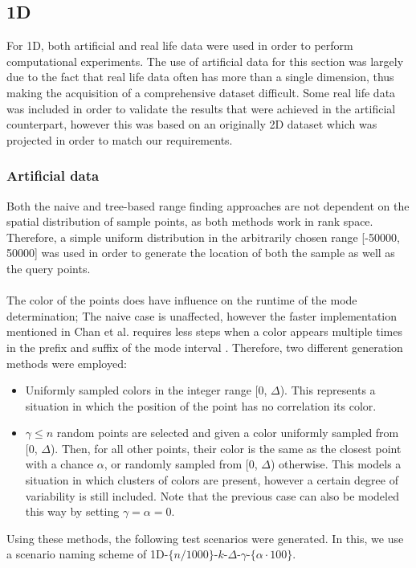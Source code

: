 \documentclass{article}
\newcommand{\fb}[1]{{\color{blue}#1}}
\begin{document}
\subsection{1D}
For 1D, both artificial and real life data were used in order to perform
computational experiments. The use of artificial data for this section was
largely due to the fact that real life data often has more than a single
dimension, thus making the acquisition of a comprehensive dataset difficult.
Some real life data was included in order to validate the results that were
achieved in the artificial counterpart, however this was based on an originally
2D dataset which was projected in order to match our requirements.
\subsubsection*{Artificial data} Both the naive and tree-based range finding
approaches are not dependent on the spatial distribution of sample points, as
both methods work in rank space. Therefore, a simple uniform distribution in
the arbitrarily chosen range [-50000, 50000] was used in order to generate the
location of both the sample as well as the query points. \\\\ The color of the
points does have influence on the runtime of the mode determination; The naive
case is unaffected, however the faster implementation mentioned in Chan et al.
requires less steps when a color appears multiple times in the prefix and
suffix of the mode interval \cite{Chan2014}. Therefore, two different
generation methods were employed:
\begin{itemize}
    \item Uniformly sampled colors in the integer range [0, $\Delta$). This represents a
          situation in which the position of the point has no correlation its color.
    \item $\gamma \leq n$ random points are selected and given a color uniformly sampled from [0, $\Delta$). Then, for all other points, their color is the same as the closest point with a chance $\alpha$, or randomly sampled from [0, $\Delta$) otherwise. This models a situation in which clusters of colors are present, however a certain degree of variability is still included. Note that the previous case can also be modeled this way by setting $\gamma=\alpha=0$.
\end{itemize}
Using these methods, the following test scenarios were generated. \fb{In this, we use a scenario naming scheme of 1D-$\{n/1000\}$-$k$-$\Delta$-$\gamma$-$\{\alpha \cdot 100\}$.} \\
\end{document}
